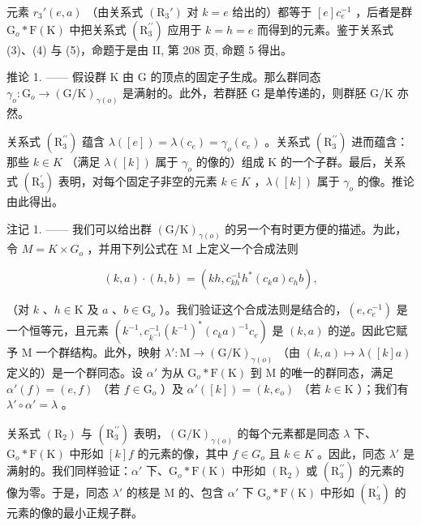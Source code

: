 元素 \(r_3'(e, a)\) （由关系式 \((\mathrm{R}_3')\) 对 \(k = e\) 给出的）都等于 \([e]c_e^{-1}\) ，后者是群 \(\mathrm{G}_o * \mathrm{F}(\mathrm{K})\) 中把关系式 \((\mathrm{R}_{3}^{\prime\prime})\) 应用于 \(k = h = e\) 而得到的元素。鉴于关系式 (3)、(4) 与 (5)，命题于是由 II, 第 208 页, 命题 5 得出。

推论 1. —— 假设群 K 由 G 的顶点的固定子生成。那么群同态 \(\gamma_{o}\colon\mathrm{G}_{o}\to(\mathrm{G}/\mathrm{K})_{\gamma(o)}\) 是满射的。此外，若群胚 G 是单传递的，则群胚 G/K 亦然。

关系式 \((\mathrm{R}_{3}^{\prime\prime})\) 蕴含 \(\lambda([e]) = \lambda(c_{e}) = \gamma_{o}(c_{e})\) 。关系式 \((\mathrm{R}_{3}^{\prime\prime})\) 进而蕴含：那些 \(k \in K\) （满足 \(\lambda([k])\) 属于 \(\gamma_{o}\) 的像的）组成 K 的一个子群。最后，关系式 \((\mathrm{R}_{3}^{\prime})\) 表明，对每个固定子非空的元素 \(k \in K\) ，\(\lambda([k])\) 属于 \(\gamma_{o}\) 的像。推论由此得出。

注记 1. —— 我们可以给出群 \((\mathrm{G}/\mathrm{K})_{\gamma(o)}\) 的另一个有时更方便的描述。为此，令 \(M = K \times G_{o}\) ，并用下列公式在 M 上定义一个合成法则

\[
(k, a) \cdot (h, b) = (k h, c _ {k h} ^ {- 1} h ^ {*} (c _ {k} a) c _ {h} b),
\]

（对 \(k\) 、\(h \in \mathrm{K}\) 及 \(a\) 、\(b \in \mathrm{G}_o\) ）。我们验证这个合成法则是结合的，\((e, c_e^{-1})\) 是一个恒等元，且元素 \((k^{-1}, c_{k^{-1}}^{-1}(k^{-1})^*(c_k a)^{-1} c_e)\) 是 \((k, a)\) 的逆。因此它赋予 M 一个群结构。此外，映射 \(\lambda'\colon \mathrm{M} \to (\mathrm{G} / \mathrm{K})_{\gamma(o)}\) （由 \((k, a) \mapsto \lambda([k]a)\) 定义的）是一个群同态。设 \(\alpha'\) 为从 \(\mathrm{G}_o * \mathrm{F}(\mathrm{K})\) 到 M 的唯一的群同态，满足 \(\alpha'(f) = (e, f)\) （若 \(f \in \mathrm{G}_o\) ）及 \(\alpha'([k]) = (k, e_o)\) （若 \(k \in \mathrm{K}\) ）；我们有 \(\lambda' \circ \alpha' = \lambda\) 。

关系式 \((\mathrm{R}_{2})\) 与 \((\mathrm{R}_{3}^{\prime\prime})\) 表明，\((\mathrm{G}/\mathrm{K})_{\gamma(o)}\) 的每个元素都是同态 \(\lambda\) 下、\(\mathrm{G}_{o}*\mathrm{F}(\mathrm{K})\) 中形如 \([k]f\) 的元素的像，其中 \(f\in G_{o}\) 且 \(k\in K\) 。因此，同态 \(\lambda'\) 是满射的。我们同样验证：\(\alpha'\) 下、\(\mathrm{G}_{o}*\mathrm{F}(\mathrm{K})\) 中形如 \((\mathrm{R}_{2})\) 或 \((\mathrm{R}_{3}^{\prime\prime})\) 的元素的像为零。于是，同态 \(\lambda'\) 的核是 M 的、包含 \(\alpha'\) 下 \(\mathrm{G}_{o}*\mathrm{F}(\mathrm{K})\) 中形如 \((\mathrm{R}_{3}^{\prime})\) 的元素的像的最小正规子群。

